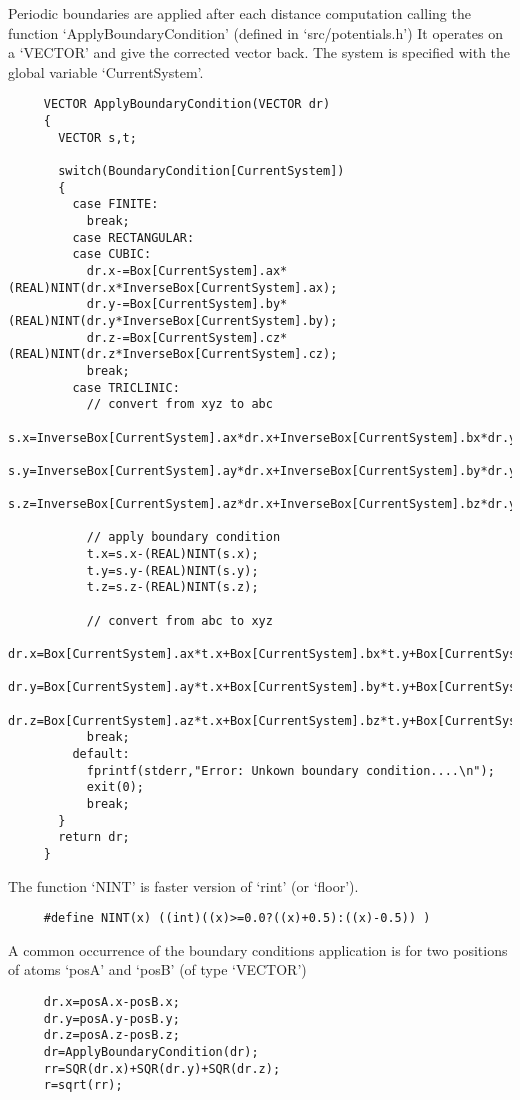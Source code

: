 Periodic boundaries are applied after each distance computation calling the function `ApplyBoundaryCondition' (defined in `src/potentials.h')
It operates on a `VECTOR' and give the corrected vector back. The system is specified with the global variable `CurrentSystem'.
\begin{footnotesize}
\begin{verbatim}
     VECTOR ApplyBoundaryCondition(VECTOR dr)
     {
       VECTOR s,t;

       switch(BoundaryCondition[CurrentSystem])
       {
         case FINITE:
           break;
         case RECTANGULAR:
         case CUBIC:
           dr.x-=Box[CurrentSystem].ax*(REAL)NINT(dr.x*InverseBox[CurrentSystem].ax);
           dr.y-=Box[CurrentSystem].by*(REAL)NINT(dr.y*InverseBox[CurrentSystem].by);
           dr.z-=Box[CurrentSystem].cz*(REAL)NINT(dr.z*InverseBox[CurrentSystem].cz);
           break;
         case TRICLINIC:
           // convert from xyz to abc
           s.x=InverseBox[CurrentSystem].ax*dr.x+InverseBox[CurrentSystem].bx*dr.y+InverseBox[CurrentSystem].cx*dr.z;
           s.y=InverseBox[CurrentSystem].ay*dr.x+InverseBox[CurrentSystem].by*dr.y+InverseBox[CurrentSystem].cy*dr.z;
           s.z=InverseBox[CurrentSystem].az*dr.x+InverseBox[CurrentSystem].bz*dr.y+InverseBox[CurrentSystem].cz*dr.z;

           // apply boundary condition
           t.x=s.x-(REAL)NINT(s.x);
           t.y=s.y-(REAL)NINT(s.y);
           t.z=s.z-(REAL)NINT(s.z);

           // convert from abc to xyz
           dr.x=Box[CurrentSystem].ax*t.x+Box[CurrentSystem].bx*t.y+Box[CurrentSystem].cx*t.z;
           dr.y=Box[CurrentSystem].ay*t.x+Box[CurrentSystem].by*t.y+Box[CurrentSystem].cy*t.z;
           dr.z=Box[CurrentSystem].az*t.x+Box[CurrentSystem].bz*t.y+Box[CurrentSystem].cz*t.z;
           break;
         default:
           fprintf(stderr,"Error: Unkown boundary condition....\n");
           exit(0);
           break;
       }
       return dr;
     }
\end{verbatim}
\end{footnotesize}
The function `NINT' is faster version of `rint' (or `floor').
\begin{footnotesize}
\begin{verbatim}
     #define NINT(x) ((int)((x)>=0.0?((x)+0.5):((x)-0.5)) )
\end{verbatim}
\end{footnotesize}
A common occurrence of the boundary conditions application is for two positions of atoms `posA' and `posB' (of type `VECTOR')
\begin{footnotesize}
\begin{verbatim}
     dr.x=posA.x-posB.x;
     dr.y=posA.y-posB.y;
     dr.z=posA.z-posB.z;
     dr=ApplyBoundaryCondition(dr);
     rr=SQR(dr.x)+SQR(dr.y)+SQR(dr.z);
     r=sqrt(rr);
\end{verbatim}
\end{footnotesize}

